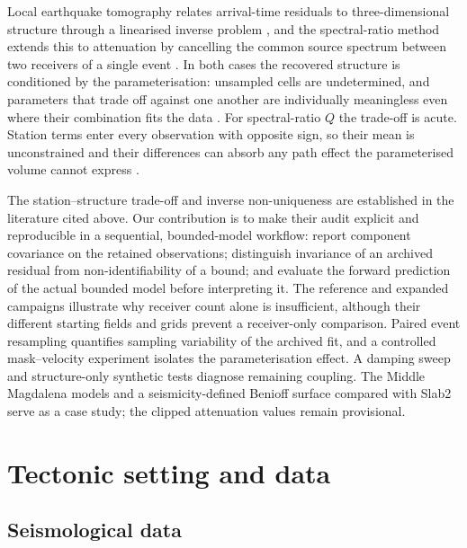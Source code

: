 \documentclass[review,authoryear,longtitle]{elsarticle}
\begin{document}
Local earthquake tomography relates arrival-time residuals to
three-dimensional structure through a linearised inverse problem
\citep{Aki1976,Crosson1976,Thurber1983,Pavlis1980}, and the
spectral-ratio method extends this to attenuation by cancelling the common
source spectrum between two receivers of a single event
\citep{AndersonHough1984,QuanHarris1997,Safak1997,EberhartPhillipsChadwick2002}.
In both cases the recovered structure is conditioned by the
parameterisation: unsampled cells are undetermined, and parameters that
trade off against one another are individually meaningless even where
their combination fits the data
\citep{Thurber1992,Zhao2015,Menke2018,Rawlinson2016}. For spectral-ratio
$Q$ the trade-off is acute. Station terms enter every observation with
opposite sign, so their mean is unconstrained and their differences can
absorb any path effect the parameterised volume cannot express
\citep{EberhartPhillipsChadwick2002,GuoThurber2021,GaoWang2016}.

The station--structure trade-off and inverse non-uniqueness are established
in the literature cited above. Our contribution is to make their audit
explicit and reproducible in a sequential, bounded-model workflow: report
component covariance on the retained observations; distinguish invariance
of an archived residual from non-identifiability of a bound; and evaluate
the forward prediction of the actual bounded model before interpreting it.
The reference and expanded campaigns illustrate why receiver count alone
is insufficient, although their different starting fields and grids
prevent a receiver-only comparison. Paired event resampling quantifies
sampling variability of the archived fit, and a controlled mask--velocity
experiment isolates the parameterisation effect. A damping sweep and
structure-only synthetic tests diagnose remaining coupling. The Middle
Magdalena models and a seismicity-defined Benioff surface compared with
Slab2 \citep{Hayes2018Slab2} serve as a case study; the clipped attenuation
values remain provisional.

\section{Tectonic setting and data}

\subsection{Seismological data}
\end{document}
